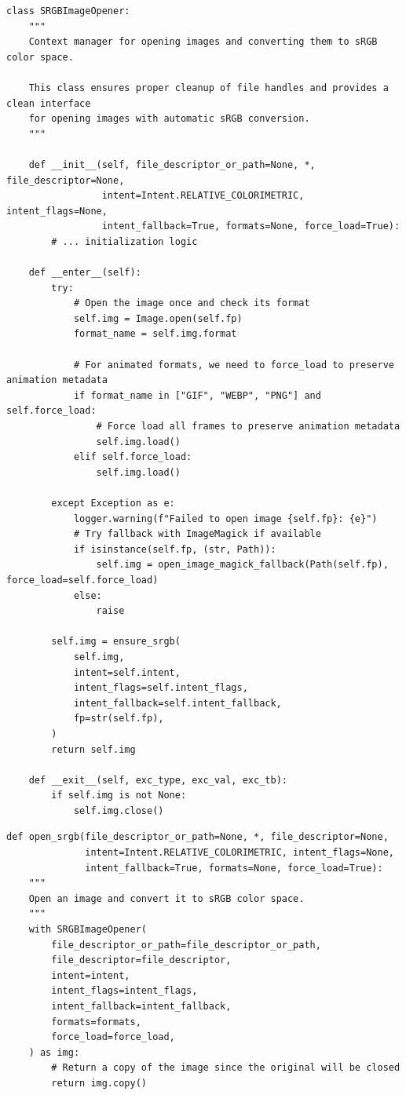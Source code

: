 \documentclass[11pt]{article}
\begin{document}
\begin{lstlisting}[style=python]
class SRGBImageOpener:
    """
    Context manager for opening images and converting them to sRGB color space.
    
    This class ensures proper cleanup of file handles and provides a clean interface
    for opening images with automatic sRGB conversion.
    """
    
    def __init__(self, file_descriptor_or_path=None, *, file_descriptor=None,
                 intent=Intent.RELATIVE_COLORIMETRIC, intent_flags=None,
                 intent_fallback=True, formats=None, force_load=True):
        # ... initialization logic
    
    def __enter__(self):
        try:
            # Open the image once and check its format
            self.img = Image.open(self.fp)
            format_name = self.img.format

            # For animated formats, we need to force_load to preserve animation metadata
            if format_name in ["GIF", "WEBP", "PNG"] and self.force_load:
                # Force load all frames to preserve animation metadata
                self.img.load()
            elif self.force_load:
                self.img.load()

        except Exception as e:
            logger.warning(f"Failed to open image {self.fp}: {e}")
            # Try fallback with ImageMagick if available
            if isinstance(self.fp, (str, Path)):
                self.img = open_image_magick_fallback(Path(self.fp), force_load=self.force_load)
            else:
                raise

        self.img = ensure_srgb(
            self.img,
            intent=self.intent,
            intent_flags=self.intent_flags,
            intent_fallback=self.intent_fallback,
            fp=str(self.fp),
        )
        return self.img
    
    def __exit__(self, exc_type, exc_val, exc_tb):
        if self.img is not None:
            self.img.close()
\end{lstlisting}

\begin{lstlisting}[style=python]
def open_srgb(file_descriptor_or_path=None, *, file_descriptor=None,
              intent=Intent.RELATIVE_COLORIMETRIC, intent_flags=None,
              intent_fallback=True, formats=None, force_load=True):
    """
    Open an image and convert it to sRGB color space.
    """
    with SRGBImageOpener(
        file_descriptor_or_path=file_descriptor_or_path,
        file_descriptor=file_descriptor,
        intent=intent,
        intent_flags=intent_flags,
        intent_fallback=intent_fallback,
        formats=formats,
        force_load=force_load,
    ) as img:
        # Return a copy of the image since the original will be closed
        return img.copy()
\end{lstlisting}
\end{document}
